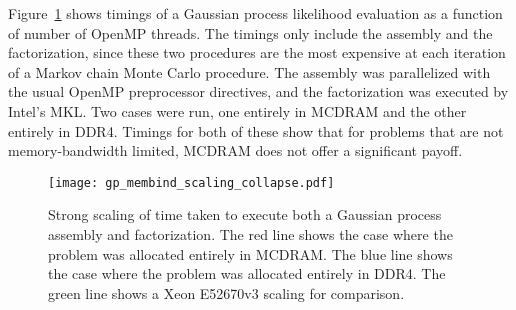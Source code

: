 Figure~\ref{fig:gp} shows timings of a Gaussian process likelihood evaluation
as a function of number of OpenMP threads.  The timings only include the
assembly and the factorization, since these two procedures are the most
expensive at each iteration of a Markov chain Monte Carlo procedure.  The
assembly was parallelized with the usual OpenMP preprocessor directives, and
the factorization was executed by Intel's MKL.  Two cases were run, one
entirely in MCDRAM and the other entirely in DDR4.  Timings for both of these
show that for problems that are not memory-bandwidth limited, MCDRAM does not
offer a significant payoff.

%
%
\begin{figure}
  \begin{center}
    \texttt{[image: gp\_membind\_scaling\_collapse.pdf]}
    \caption{Strong scaling of time taken to execute both a Gaussian process
    assembly and factorization.  The red line shows the case where the problem
    was allocated entirely in MCDRAM.  The blue line shows the case where the
    problem was allocated entirely in DDR4.  The green line shows a Xeon E52670v3
    scaling for comparison.}
    \label{fig:gp}
  \end{center}
\end{figure}
